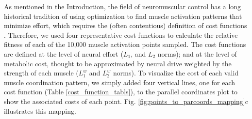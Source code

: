 \documentclass[10pt,letterpaper]{article}
\begin{document}
As mentioned in the Introduction, the field of neuromuscular control has a long historical tradition of using optimization to find muscle activation patterns that minimize effort, which requires the (often contentious) definition of cost functions \cite{Prilutsky2000Muscle,crowninshield1981physiologically}. Therefore, we used four representative cost functions to calculate the relative fitness of each of the 10,000 muscle activation points sampled. The cost functions are defined at the level of neural effort ($L_1$, and $L_2$ norms); and at the level of metabolic cost, thought to be approximated by neural drive weighted by the strength of each muscle ($L_1^w$ and $L_2^w$ norms).
% 
% 
To visualize the cost of each valid muscle coordination pattern, we simply added four vertical lines, one for each cost function (Table \ref{cost_function_tabls}), to the parallel coordinates plot to show the associated costs of each point. Fig. \ref{fig:points_to_parcoords_mapping}c illustrates this mapping.
\end{document}
